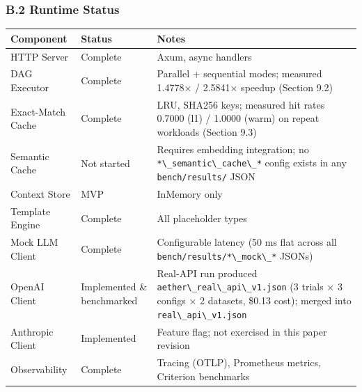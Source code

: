 \documentclass[
]{article}
\newcommand{\passthrough}[1]{#1}
\newcounter{none} %
\begin{document}
\subsubsection{B.2 Runtime Status}\label{b.2-runtime-status}

{\def\LTcaptype{none} %
\begin{longtable}[]{@{}
  >{\raggedright\arraybackslash}p{}
  >{\raggedright\arraybackslash}p{}
  >{\raggedright\arraybackslash}p{}@{}}
\toprule\noalign{}
\begin{minipage}[b]{\linewidth}\raggedright
Component
\end{minipage} & \begin{minipage}[b]{\linewidth}\raggedright
Status
\end{minipage} & \begin{minipage}[b]{\linewidth}\raggedright
Notes
\end{minipage} \\
\midrule\noalign{}
\endhead
\bottomrule\noalign{}
\endlastfoot
HTTP Server & Complete & Axum, async handlers \\
DAG Executor & Complete & Parallel + sequential modes; measured 1.4778×
/ 2.5841× speedup (Section 9.2) \\
Exact-Match Cache & Complete & LRU, SHA256 keys; measured hit rates
0.7000 (l1) / 1.0000 (warm) on repeat workloads (Section 9.3) \\
Semantic Cache & Not started & Requires embedding integration; no
\passthrough{\lstinline!*\_semantic\_cache\_*!} config exists in any
\passthrough{\lstinline!bench/results/!} JSON \\
Context Store & MVP & InMemory only \\
Template Engine & Complete & All placeholder types \\
Mock LLM Client & Complete & Configurable latency (50 ms flat across all
\passthrough{\lstinline!bench/results/*\_mock\_*!} JSONs) \\
OpenAI Client & Implemented \& benchmarked & Real-API run produced
\passthrough{\lstinline!aether\_real\_api\_v1.json!} (3 trials × 3
configs × 2 datasets, \$0.13 cost); merged into
\passthrough{\lstinline!real\_api\_v1.json!} \\
Anthropic Client & Implemented & Feature flag; not exercised in this
paper revision \\
Observability & Complete & Tracing (OTLP), Prometheus metrics, Criterion
benchmarks \\
\end{longtable}
}
\end{document}
